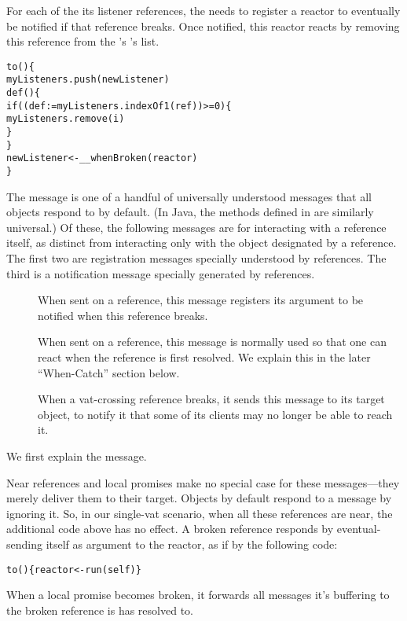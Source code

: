 \documentclass{llncs}
\begin{document}
For each of the its listener references, the  needs
to register a reactor to eventually be notified if that reference
breaks. Once notified, this reactor reacts by removing this reference
from the 's 's list.
%
\begin{alltt}
    to () \{
        myListeners.push(newListener)
        def () \{
            if ((def  := myListeners.indexOf1(ref)) >= 0) \{
                myListeners.remove(i)
            \}
        \}
        newListener <- \_\_whenBroken(reactor)
    \}
\end{alltt}
%
The  message is one of a handful of universally
understood messages that all objects respond to by default. (In Java,
the methods defined in  are similarly
universal.) Of these, the following messages are for interacting with
a reference itself, as distinct from interacting only with the object
designated by a reference. The first two are registration messages
specially understood by references. The third is a notification
message specially generated by references.
%
\begin{description}
\item[] When sent on a reference,
  this message registers its argument to be notified when this
  reference breaks.
\item[] When sent on a
  reference, this message is normally used so that one can react when
  the reference is first resolved. We explain this in the later
  ``When-Catch'' section below.
\item[] When a
  vat-crossing reference breaks, it sends this message to its target
  object, to notify it that some of its clients may no longer be able
  to reach it.
\end{description}
%
We first explain the  message.

Near references and local promises make no special case for these
messages---they merely deliver them to their target. Objects by
default respond to a  message by ignoring it. So,
in our single-vat scenario, when all these references are near, the
additional code above has no effect. A broken reference responds by
eventual-sending itself as argument to the reactor, as if by the
following code:
%
\begin{alltt}
    to () \{ reactor <- run(self) \}
\end{alltt}
%
When a local promise becomes broken, it forwards all messages it's
buffering to the broken reference is has resolved to. 
\end{document}

